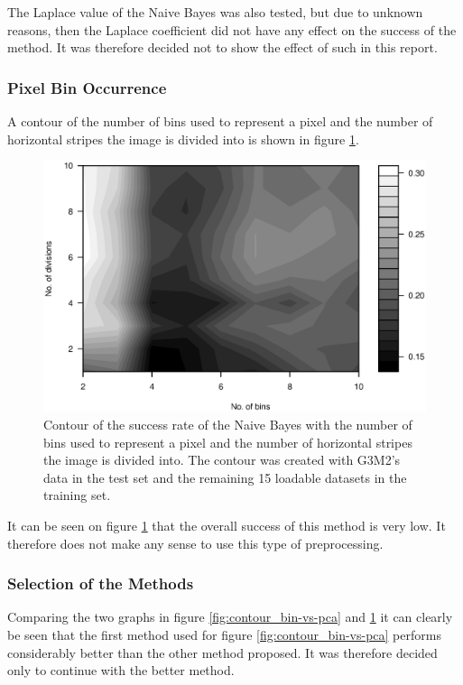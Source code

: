 The Laplace value of the Naive Bayes was also tested, but due to unknown reasons, then the Laplace coefficient did not have any effect on the success of the method.
It was therefore decided not to show the effect of such in this report.

\subsubsection{Pixel Bin Occurrence}
A contour of the number of bins used to represent a pixel and the number of horizontal stripes the image is divided into is shown in figure \ref{fig:contour_bin-vs-div}.

\begin{figure}[H]
\centering
\includegraphics[width = \textwidth]{graphics/contour_bins_vs_divs}
\caption{Contour of the success rate of the Naive Bayes with the number of bins used to represent a pixel and the number of horizontal stripes the image is divided into.
The contour was created with G3M2's data in the test set and the remaining 15 loadable datasets in the training set.}
\label{fig:contour_bin-vs-div}
\end{figure}

It can be seen on figure \ref{fig:contour_bin-vs-div} that the overall success of this method is very low.
It therefore does not make any sense to use this type of preprocessing.



\subsubsection{Selection of the Methods}
Comparing the two graphs in figure \ref{fig:contour_bin-vs-pca} and \ref{fig:contour_bin-vs-div} it can clearly be seen that the first method used for figure \ref{fig:contour_bin-vs-pca} performs considerably better than the other method proposed.
It was therefore decided only to continue with the better method.
